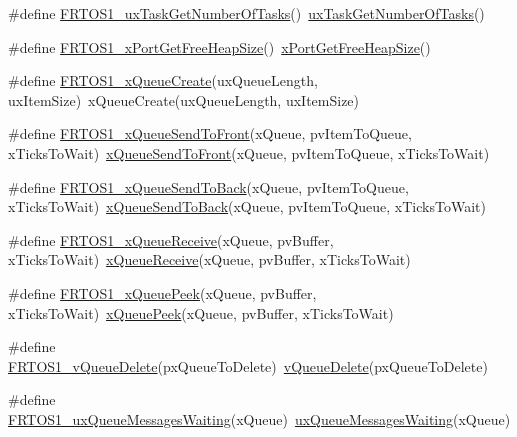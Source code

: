 \begin{DoxyCompactItemize}
\item 
\#define \hyperlink{group___f_r_t_o_s1__module_ga5e6c4a5e6515fba1103b45d23a0b674d}{F\+R\+T\+O\+S1\+\_\+ux\+Task\+Get\+Number\+Of\+Tasks}()~\hyperlink{tasks_8c_a4b660446c721df74158dddb9fc189c1e}{ux\+Task\+Get\+Number\+Of\+Tasks}()
\item 
\#define \hyperlink{group___f_r_t_o_s1__module_ga1b1f79bf76eddf7de775d1dad57ff762}{F\+R\+T\+O\+S1\+\_\+x\+Port\+Get\+Free\+Heap\+Size}()~\hyperlink{portable_8h_a8f72fbee5c25c956bda528299ce6dd02}{x\+Port\+Get\+Free\+Heap\+Size}()
\item 
\#define \hyperlink{group___f_r_t_o_s1__module_gac8252acb1e18de782bb342837c8c8494}{F\+R\+T\+O\+S1\+\_\+x\+Queue\+Create}(ux\+Queue\+Length,  ux\+Item\+Size)~x\+Queue\+Create(ux\+Queue\+Length, ux\+Item\+Size)
\item 
\#define \hyperlink{group___f_r_t_o_s1__module_gaf9606ddcf23b9e935c653dcbce5876ef}{F\+R\+T\+O\+S1\+\_\+x\+Queue\+Send\+To\+Front}(x\+Queue,  pv\+Item\+To\+Queue,  x\+Ticks\+To\+Wait)~\hyperlink{queue_8h_aa612fcc2b1ceee0200f34b942e300b41}{x\+Queue\+Send\+To\+Front}(x\+Queue, pv\+Item\+To\+Queue, x\+Ticks\+To\+Wait)
\item 
\#define \hyperlink{group___f_r_t_o_s1__module_ga2dafade8e0fcf46fe21f9b1d2607321c}{F\+R\+T\+O\+S1\+\_\+x\+Queue\+Send\+To\+Back}(x\+Queue,  pv\+Item\+To\+Queue,  x\+Ticks\+To\+Wait)~\hyperlink{queue_8h_a81d24a2c1199d58efb76fbee15853112}{x\+Queue\+Send\+To\+Back}(x\+Queue, pv\+Item\+To\+Queue, x\+Ticks\+To\+Wait)
\item 
\#define \hyperlink{group___f_r_t_o_s1__module_gad7427f2ce5bedcbb303ab1c78f1b08e8}{F\+R\+T\+O\+S1\+\_\+x\+Queue\+Receive}(x\+Queue,  pv\+Buffer,  x\+Ticks\+To\+Wait)~\hyperlink{queue_8h_af1549eac0e7f05694a59a0b967c80be3}{x\+Queue\+Receive}(x\+Queue, pv\+Buffer, x\+Ticks\+To\+Wait)
\item 
\#define \hyperlink{group___f_r_t_o_s1__module_gab392410953e79e4f03f1e842fc42911e}{F\+R\+T\+O\+S1\+\_\+x\+Queue\+Peek}(x\+Queue,  pv\+Buffer,  x\+Ticks\+To\+Wait)~\hyperlink{queue_8h_a2df70733bb875477cd9614c5b3446257}{x\+Queue\+Peek}(x\+Queue, pv\+Buffer, x\+Ticks\+To\+Wait)
\item 
\#define \hyperlink{group___f_r_t_o_s1__module_ga388235cc97c9014b4f9006b1bdfeea28}{F\+R\+T\+O\+S1\+\_\+v\+Queue\+Delete}(px\+Queue\+To\+Delete)~\hyperlink{queue_8h_a707cbcfe3aed6b877b6aa6d9d75a3f22}{v\+Queue\+Delete}(px\+Queue\+To\+Delete)
\item 
\#define \hyperlink{group___f_r_t_o_s1__module_gac773bdbaf0114e0fd5e474aaf45d920e}{F\+R\+T\+O\+S1\+\_\+ux\+Queue\+Messages\+Waiting}(x\+Queue)~\hyperlink{queue_8h_add7ee0701ba35904d190811b9e5a4eda}{ux\+Queue\+Messages\+Waiting}(x\+Queue)

\end{DoxyCompactItemize}
